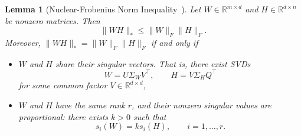 \documentclass[11pt]{article}
\newtheorem{lemma}{Lemma}
\begin{document}
\begin{lemma}[Nuclear-Frobenius Norm Inequality~\citep{fazel2002matrix}]
  \label{lem:nuclear_frobenius_combined}
  Let \(W \in \mathbb{R}^{m \times d}\) and \(H \in \mathbb{R}^{d \times n}\) be nonzero matrices. Then
  \[
  \|W H\|_{*} \le \|W\|_{F} \|H\|_{F}.
  \]
  Moreover, \(\|W H\|_{*} = \|W\|_{F} \|H\|_{F}\) if and only if
  \begin{itemize}
  \item \(W\) and \(H\) share their singular vectors. That is, there exist SVDs
  \[
  W = U \Sigma_W V^\top, \qquad
  H = V \Sigma_H Q^\top
  \]
  for some common factor \(V \in \mathbb{R}^{d \times d}\),
  \item \(W\) and \(H\) have the same rank \(r\), and their nonzero singular values are proportional: there exists \(k>0\) such that
  \[
  s_i(W) = k s_i(H), \qquad i = 1, \dots, r.
  \]
  \end{itemize}
\end{lemma}
\end{document}
